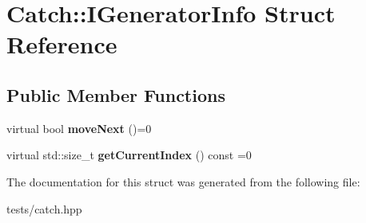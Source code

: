 \hypertarget{struct_catch_1_1_i_generator_info}{}\section{Catch\+:\+:I\+Generator\+Info Struct Reference}
\label{struct_catch_1_1_i_generator_info}
\subsection*{Public Member Functions}
\begin{DoxyCompactItemize}
\item 
\mbox{\label{struct_catch_1_1_i_generator_info_a2b86711ca7009903edfe27ed62b515ef}} 
virtual bool {\bfseries move\+Next} ()=0
\item 
\mbox{\label{struct_catch_1_1_i_generator_info_a6a0dca712d31f6849fd9447b1344673a}} 
virtual std\+::size\+\_\+t {\bfseries get\+Current\+Index} () const =0
\end{DoxyCompactItemize}


The documentation for this struct was generated from the following file\+:\begin{DoxyCompactItemize}
\item 
tests/catch.\+hpp\end{DoxyCompactItemize}
